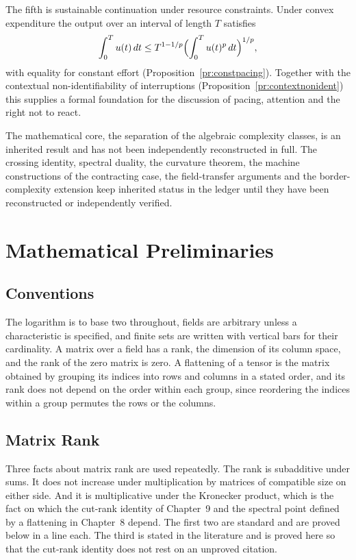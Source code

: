 \documentclass[11pt,letterpaper]{report}
\theoremstyle{plain}
\theoremstyle{definition}
\theoremstyle{remark}
\begin{document}
The fifth is sustainable continuation under resource constraints. Under convex expenditure the output over an interval of length $T$ satisfies
\[
\int_0^Tu(t)\,dt\le T^{1-1/p}\Bigl(\int_0^Tu(t)^p\,dt\Bigr)^{1/p},
\]
with equality for constant effort (Proposition~\ref{pr:constpacing}). Together with the contextual non-identifiability of interruptions (Proposition~\ref{pr:contextnonident}) this supplies a formal foundation for the discussion of pacing, attention and the right not to react.

The mathematical core, the separation of the algebraic complexity classes, is an inherited result and has not been independently reconstructed in full. The crossing identity, spectral duality, the curvature theorem, the machine constructions of the contracting case, the field-transfer arguments and the border-complexity extension keep inherited status in the ledger until they have been reconstructed or independently verified.

\appendix
\chapter{Mathematical Preliminaries}

\section{Conventions}

The logarithm is to base two throughout, fields are arbitrary unless a characteristic is specified, and finite sets are written with vertical bars for their cardinality. A matrix over a field has a rank, the dimension of its column space, and the rank of the zero matrix is zero. A flattening of a tensor is the matrix obtained by grouping its indices into rows and columns in a stated order, and its rank does not depend on the order within each group, since reordering the indices within a group permutes the rows or the columns.

\section{Matrix Rank}

Three facts about matrix rank are used repeatedly. The rank is subadditive under sums. It does not increase under multiplication by matrices of compatible size on either side. And it is multiplicative under the Kronecker product, which is the fact on which the cut-rank identity of Chapter~9 and the spectral point defined by a flattening in Chapter~8 depend. The first two are standard and are proved below in a line each. The third is stated in the literature and is proved here so that the cut-rank identity does not rest on an unproved citation.
\end{document}
